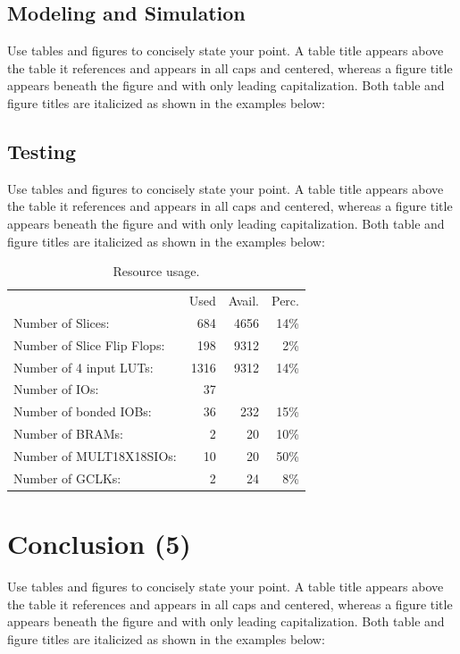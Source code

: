 \documentclass[12pt, letterpaper]{article}
\begin{document}
\subsection{Modeling and Simulation}
Use tables and figures to concisely state your point. A table title appears above the table it references and appears in all caps and centered, whereas a figure title appears beneath the figure and with only leading capitalization. Both table and figure titles are italicized as shown in the examples below:

\subsection{Testing}
Use tables and figures to concisely state your point. A table title appears above the table it references and appears in all caps and centered, whereas a figure title appears beneath the figure and with only leading capitalization. Both table and figure titles are italicized as shown in the examples below:

\begin{table}[h]
\centering
\begin{tabular}{l  r  r  r}
                                       & Used  & Avail. & Perc. \\
  Number of Slices:                    &  684  & 4656  &  14\%  \\
  Number of Slice Flip Flops:          &  198  & 9312  &   2\%  \\
  Number of 4 input LUTs:              & 1316  & 9312  &  14\%  \\
  Number of IOs:                       &   37  &       &      \\
  Number of bonded IOBs:               &   36  &  232  &  15\%  \\
  Number of BRAMs:                     &    2  &   20  &  10\%  \\
  Number of MULT18X18SIOs:             &   10  &   20  &  50\%  \\
  Number of GCLKs:                     &    2  &   24  &   8\%  \\
\end{tabular}
\caption{Resource usage.}
\label{tab:usage}
\end{table}


\section{Conclusion (5)}
Use tables and figures to concisely state your point. A table title appears above the table it references and appears in all caps and centered, whereas a figure title appears beneath the figure and with only leading capitalization. Both table and figure titles are italicized as shown in the examples below:
\end{document}
